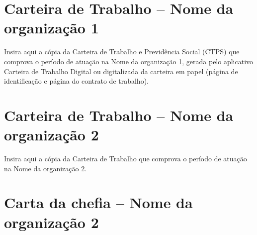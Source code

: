 \documentclass[memorial,capa]{texifsap}
\begin{document}
%
%   
\anexos


\chapter{Carteira de Trabalho -- Nome da organização 1}
\label{anx:ctps}

Insira aqui a cópia da Carteira de Trabalho e Previdência Social (CTPS)
que comprova o período de atuação na Nome da organização 1, gerada pelo
aplicativo Carteira de Trabalho Digital ou digitalizada da carteira em
papel (página de identificação e página do contrato de trabalho).

\chapter{Carteira de Trabalho -- Nome da organização 2}
\label{anx:ctps2}

Insira aqui a cópia da Carteira de Trabalho que comprova o período de
atuação na Nome da organização 2.

\chapter{Carta da chefia -- Nome da organização 2}
\label{anx:carta}
\end{document}
